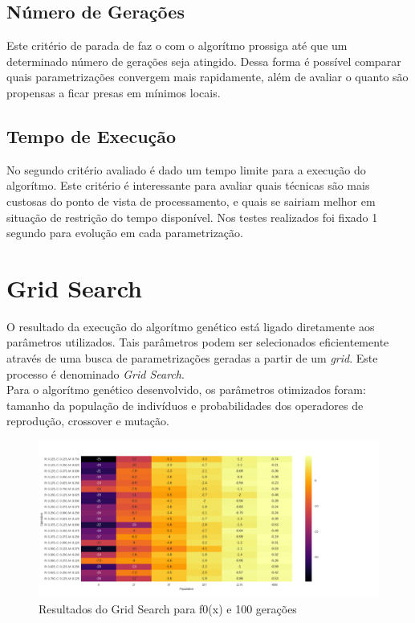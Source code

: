 \documentclass[conference]{IEEEtran}
\begin{document}
\subsection{Número de Gerações}
Este critério de parada de faz o com o algorítmo prossiga até que um determinado
número de gerações seja atingido. Dessa forma é possível comparar quais
parametrizações convergem mais rapidamente, além de avaliar o quanto são
propensas a ficar presas em mínimos locais.

\subsection{Tempo de Execução}
No segundo critério avaliado é dado um tempo limite para a execução do
algorítmo. Este critério é interessante para avaliar quais técnicas são mais
custosas do ponto de vista de processamento, e quais se sairiam melhor em 
situação de restrição do tempo disponível. Nos testes realizados foi fixado 
1 segundo para evolução em cada parametrização.

\section{Grid Search}
O resultado da execução do algorítmo genético está ligado diretamente aos
parâmetros utilizados. Tais parâmetros podem ser selecionados eficientemente
através de uma busca de parametrizações geradas a partir de um \textit{grid}.
Este processo é denominado \textit{Grid Search}.\\
Para o algorítmo genético desenvolvido, os parâmetros otimizados foram: tamanho 
da população de indivíduos e probabilidades dos operadores de reprodução, 
crossover e mutação.

\begin{figure}[!t]
\centering
\includegraphics[scale=0.5]{f0_test_grid_search_100_generations}
\caption{Resultados do Grid Search para f0(x) e 100 gerações}
\end{figure}
\end{document}
